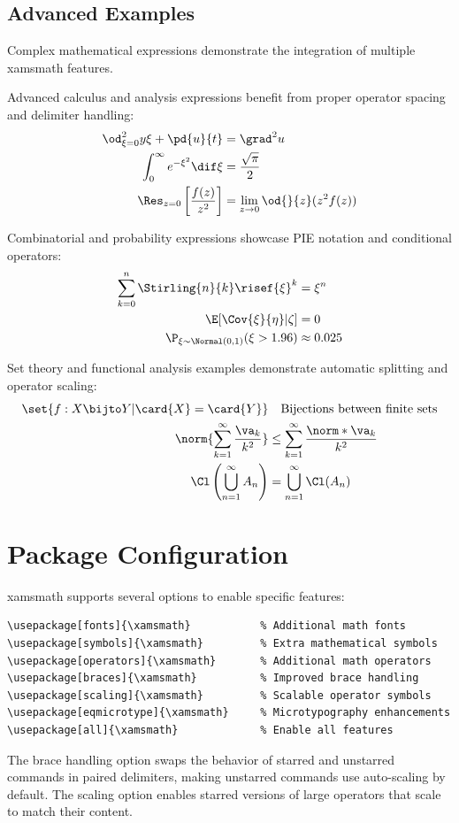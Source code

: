 \documentclass{article}
\begin{document}
\subsection{Advanced Examples}

Complex mathematical expressions demonstrate the integration of multiple xamsmath features.

Advanced calculus and analysis expressions benefit from proper operator spacing and delimiter handling:
\begin{align*}
\od^2_{\xi=0}{y}{\xi} + \pd{u}{t} &= \grad^2 u \\
\int_0^\infty e^{-\xi^2} \dif \xi &= \frac{\sqrt{\pi}}{2} \\
\Res_{z=0}\left[\frac{f(z)}{z^2}\right] &= \lim_{z\to 0} \od{}{z}(z^2 f(z))
\end{align*}

Combinatorial and probability expressions showcase PIE notation and conditional operators:
\begin{align*}
\sum_{k=0}^n \Stirling{n}{k} \risef{\xi}^k &= \xi^n \\
\E[\Cov{\xi}{\eta} | \zeta] &= 0 \\
\P_{\xi \sim \Normal(0,1)}(\xi > 1.96) &\approx 0.025
\end{align*}

Set theory and functional analysis examples demonstrate automatic splitting and operator scaling:
\begin{align*}
\set{f: X \bijto Y | \card{X} = \card{Y}} &\quad\text{Bijections between finite sets} \\
\norm{\sum_{k=1}^\infty \frac{\va_k}{k^2}} &\leq \sum_{k=1}^\infty \frac{\norm*{\va_k}}{k^2} \\
\Cl\left(\bigcup_{n=1}^\infty A_n\right) &= \bigcup_{n=1}^\infty \Cl(A_n)
\end{align*}

\section{Package Configuration}

xamsmath supports several options to enable specific features:

\begin{verbatim}
\usepackage[fonts]{\xamsmath}           % Additional math fonts
\usepackage[symbols]{\xamsmath}         % Extra mathematical symbols  
\usepackage[operators]{\xamsmath}       % Additional math operators
\usepackage[braces]{\xamsmath}          % Improved brace handling
\usepackage[scaling]{\xamsmath}         % Scalable operator symbols
\usepackage[eqmicrotype]{\xamsmath}     % Microtypography enhancements
\usepackage[all]{\xamsmath}             % Enable all features
\end{verbatim}

The brace handling option swaps the behavior of starred and unstarred commands in paired delimiters, making unstarred commands use auto-scaling by default. The scaling option enables starred versions of large operators that scale to match their content.
\end{document}

